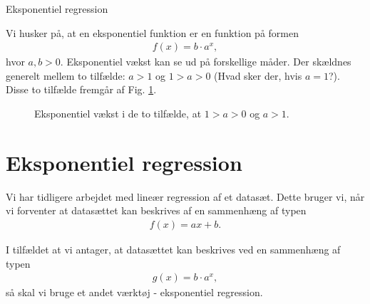 \documentclass[12pt]{article}
\begin{document}



\begin{center}
\Huge
Eksponentiel regression
\end{center}
Vi husker på, at en eksponentiel funktion er en funktion på formen
\begin{align*}
f(x) = b\cdot a^x,
\end{align*}
hvor $a,b>0.$ Eksponentiel vækst kan se ud på forskellige måder. Der skældnes generelt mellem to tilfælde: $a>1$ og $1>a>0$ (Hvad sker der, hvis $a=1$?). Disse to tilfælde fremgår af Fig. \ref{fig:eksp}.
\begin{figure}[H]
\centering
{}
\caption{Eksponentiel vækst i de to tilfælde, at $1>a>0$ og $a>1$.}
\label{fig:eksp}
\end{figure}

\section*{Eksponentiel regression}

Vi har tidligere arbejdet med lineær regression af et datasæt. Dette bruger vi, når vi forventer at datasættet kan beskrives af en sammenhæng af typen
\begin{align*}
	f(x) = ax+b.
\end{align*}

I tilfældet at vi antager, at datasættet kan beskrives ved en sammenhæng af typen 
\begin{align*}
	g(x) = b\cdot a^x, 
\end{align*}
så skal vi bruge et andet værktøj - eksponentiel regression. 
\end{document}
